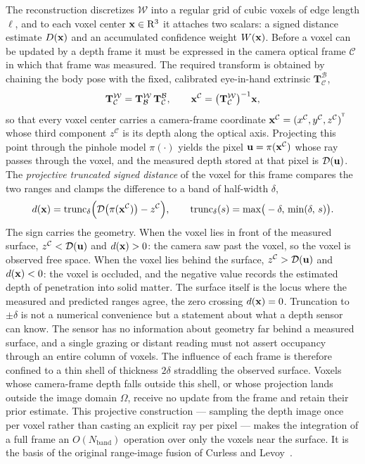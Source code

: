 The reconstruction discretizes $\mathcal W$ into a regular grid of cubic voxels of edge length $\ell$, and to each voxel center $\mathbf{x}\in\mathrm{R}^3$ it attaches two scalars: a signed distance estimate $D(\mathbf{x})$ and an accumulated confidence weight $W(\mathbf{x})$. Before a voxel can be updated by a depth frame it must be expressed in the camera optical frame $\mathcal C$ in which that frame was measured. The required transform is obtained by chaining the body pose with the fixed, calibrated eye-in-hand extrinsic $\mathbf{T}^{\mathcal B}_{\mathcal C}$,
\begin{equation}
  \mathbf{T}^{\mathcal W}_{\mathcal C}=\mathbf{T}^{\mathcal W}_{\mathcal B}\,\mathbf{T}^{\mathcal B}_{\mathcal C},
  \qquad
  \mathbf{x}^{\mathcal C}=\big(\mathbf{T}^{\mathcal W}_{\mathcal C}\big)^{-1}\mathbf{x} ,
  \label{meth:eq:nvblox-register}
\end{equation}
so that every voxel center carries a camera-frame coordinate $\mathbf{x}^{\mathcal C}=(x^{\mathcal C},y^{\mathcal C},z^{\mathcal C})^{^{\mathsf{T}}}$ whose third component $z^{\mathcal C}$ is its depth along the optical axis. Projecting this point through the pinhole model $\pi(\cdot)$ yields the pixel $\mathbf{u}=\pi(\mathbf{x}^{\mathcal C})$ whose ray passes through the voxel, and the measured depth stored at that pixel is $\mathcal{D}(\mathbf{u})$. The \emph{projective truncated signed distance} of the voxel for this frame compares the two ranges and clamps the difference to a band of half-width $\delta$,
\begin{equation}
  d(\mathbf{x})=\operatorname{trunc}_\delta\!\Big(\mathcal{D}\big(\pi(\mathbf{x}^{\mathcal C})\big)-z^{\mathcal C}\Big),
  \qquad
  \operatorname{trunc}_\delta(s)=\max\!\big(-\delta,\,\min(\delta,\,s)\big).
  \label{meth:eq:tsdf}
\end{equation}
The sign carries the geometry. When the voxel lies in front of the measured surface, $z^{\mathcal C}<\mathcal{D}(\mathbf{u})$ and $d(\mathbf{x})>0$: the camera saw past the voxel, so the voxel is observed free space. When the voxel lies behind the surface, $z^{\mathcal C}>\mathcal{D}(\mathbf{u})$ and $d(\mathbf{x})<0$: the voxel is occluded, and the negative value records the estimated depth of penetration into solid matter. The surface itself is the locus where the measured and predicted ranges agree, the zero crossing $d(\mathbf{x})=0$. Truncation to $\pm\delta$ is not a numerical convenience but a statement about what a depth sensor can know. The sensor has no information about geometry far behind a measured surface, and a single grazing or distant reading must not assert occupancy through an entire column of voxels. The influence of each frame is therefore confined to a thin shell of thickness $2\delta$ straddling the observed surface. Voxels whose camera-frame depth falls outside this shell, or whose projection lands outside the image domain $\Omega$, receive no update from the frame and retain their prior estimate. This projective construction --- sampling the depth image once per voxel rather than casting an explicit ray per pixel --- makes the integration of a full frame an $O(N_{\text{band}})$ operation over only the voxels near the surface. It is the basis of the original range-image fusion of Curless and Levoy~\cite{curless1996tsdf}.

